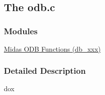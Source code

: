 \subsection{The odb.c}
\label{group__odbcode}
\subsubsection*{Modules}
\begin{DoxyCompactItemize}
\item 
\hyperlink{group__odbfunctionc}{Midas ODB Functions (db\_\-xxx)}
\end{DoxyCompactItemize}


\subsubsection{Detailed Description}
dox 